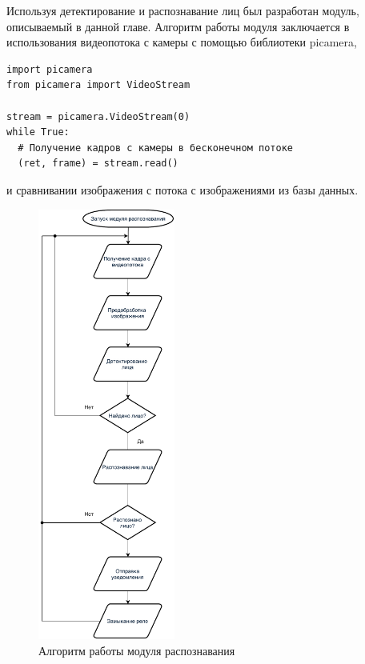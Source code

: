 Используя детектирование и распознавание лиц был разработан модуль,
описываемый в данной главе. Алгоритм работы модуля заключается в использования
видеопотока с камеры с помощью библиотеки picamera,

\begin{lstlisting}
import picamera 
from picamera import VideoStream

stream = picamera.VideoStream(0)
while True:
  # Получение кадров с камеры в бесконечном потоке
  (ret, frame) = stream.read()
\end{lstlisting}
и сравнивании изображения с потока с изображениями из базы данных. 

\newpage

\begin{figure}[h!]
  \centering
  \setlength{\fboxsep}{5pt}
  \includegraphics[width=0.4\textwidth]{data-visualisation/image-processing}
  \vspace*{6pt}
  \caption{Алгоритм работы модуля распознавания}\label{fig:image-processing}
\end{figure}
